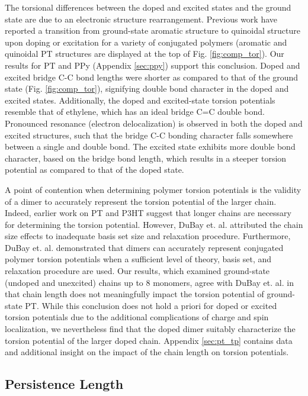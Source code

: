 The torsional differences between the doped and excited states and the ground state are due to an electronic structure rearrangement. Previous work have reported a transition from ground-state aromatic structure to quinoidal structure upon doping or excitation for a variety of conjugated polymers (aromatic and quinoidal PT structures are displayed at the top of Fig. \ref{fig:comp_tor}).\cite{Roth2005, Burrezo2017, Wells2008, Aime1989, Banerji2011, Roseli2017, Busby2011, Yu2014, Fonner2010, Baitoul2000, Bradley1989} Our results for PT and PPy (Appendix \ref{sec:ppy}) support this conclusion. Doped and excited bridge C-C bond lengths were shorter as compared to that of the ground state (Fig. \ref{fig:comp_tor}), signifying double bond character in the doped and excited states. Additionally, the doped and excited-state torsion potentials resemble that of ethylene, which has an ideal bridge C=C double bond.\cite{Shao2003} Pronounced resonance (electron delocalization) is observed in both the doped and excited structures, such that the bridge C-C bonding character falls somewhere between a single and double bond. The excited state exhibits more double bond character, based on the bridge bond length, which results in a steeper torsion potential as compared to that of the doped state.

A point of contention when determining polymer torsion potentials is the validity of a dimer to accurately represent the torsion potential of the larger chain. Indeed, earlier work on PT and P3HT suggest that longer chains are necessary for determining the torsion potential.\cite{Darling2009} However, DuBay et. al. attributed the chain size effects to inadequate basis set size and relaxation procedure. Furthermore, DuBay et. al. demonstrated that dimers can accurately represent conjugated polymer torsion potentials when a sufficient level of theory, basis set, and relaxation procedure are used.\cite{Dubay2012} Our results, which examined ground-state (undoped and unexcited) chains up to 8 monomers, agree with DuBay et. al. in that chain length does not meaningfully impact the torsion potential of ground-state PT. While this conclusion does not hold a priori for doped or excited torsion potentials due to the additional complications of charge and spin localization, we nevertheless find that the doped dimer suitably characterize the torsion potential of the larger doped chain. Appendix \ref{sec:pt_tp} contains data and additional insight on the impact of the chain length on torsion potentials.

\subsection{Persistence Length}

